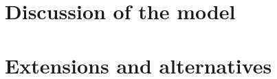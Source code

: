 \documentclass[a4paper]{scrartcl}
\begin{document}
\section{Discussion of the model}

\section{Extensions and alternatives}
\end{document}
